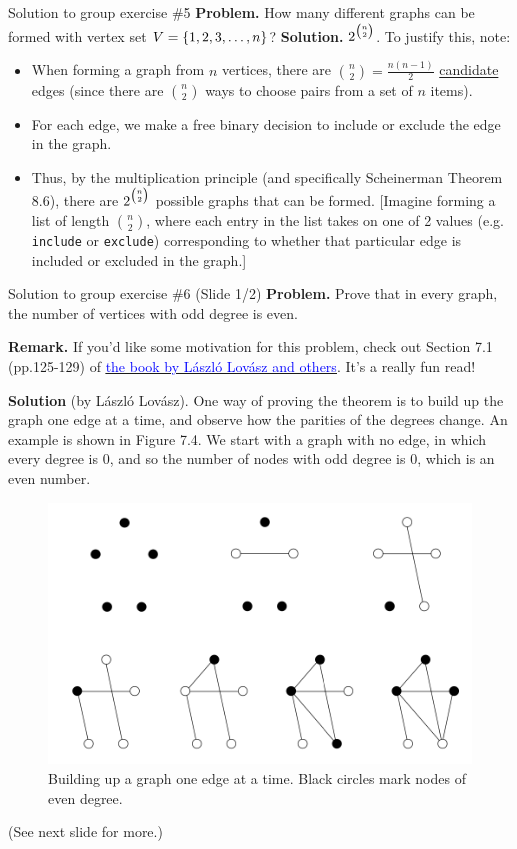 \documentclass[10pt]{beamer}
\begin{document}
\begin{frame}{Solution to group exercise \#5}
\small 
\textbf{Problem.} How many different graphs can be formed with vertex set $V=\{ {1,2,3,\hdots,n} \}$?
\vfill 
\textbf{Solution.}  $2^{\raisebox{0.3ex}{\scriptsize$\binom{n}{2}$}}$.   To justify this, note:
\begin{itemize}
\item When forming a graph from $n$ vertices, there are $\binom{n}{2}=\frac{n(n-1)}{2}$ \underline{candidate} edges (since there are $\binom{n}{2}$ ways to choose pairs from a set of $n$ items).
\item  For each edge, we make a free binary decision to include or exclude the edge in the graph.
\item  Thus, by the multiplication principle (and specifically Scheinerman Theorem 8.6), there are $2^{\raisebox{0.3ex}{\scriptsize$\binom{n}{2}$}}$ possible graphs that can be formed.  [Imagine forming a list of length $\binom{n}{2}$, where each entry in the list takes on one of 2 values (e.g. \texttt{include} or \texttt{exclude}) corresponding to whether that particular edge is included or excluded in the graph.]
\end{itemize}

	
\end{frame}

\begin{frame}{Solution to group exercise \#6 (Slide 1/2)} 
\footnotesize 
\textbf{Problem.} Prove that in every graph, the number of vertices with odd degree is even. 

\vfill 
\textbf{Remark.} If you'd like some motivation for this problem, check out Section 7.1 (pp.125-129) of \href{https://file.fouladi.ir/courses/discmath/books/Springer.Verlag.Discrete.Mathematics.Elementary.and.Beyond.ebook-TLFeBOOK.pdf}{\underline{\textcolor{blue}{the book by L\'aszl\'o Lov\'asz and others}}}.  It's a really fun read!

\vfill 

\textbf{Solution} (by L\'aszl\'o Lov\'asz).  One way of proving the theorem is to build up the graph one edge at a time, and observe how the parities of the degrees change. An example is shown in Figure 7.4. We start with a graph with no edge, in which every degree is 0, and so the number of nodes with odd degree is 0, which is an even number.
 
\begin{figure}
\includegraphics[width=.4\linewidth]{images/number_of_nodes_with_odd_degree_is_even.png}	
\caption{Building up a graph one edge at a time. Black circles mark nodes of even degree.}
\end{figure}

\hfill (See next slide for more.)

\end{frame}
\end{document}
